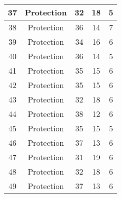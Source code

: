 \documentclass[results.tex]{subfiles}
\begin{document}
\begin{center}
\begin{tabular}{| c || c | c | c | c |}
            \hline
            37                      & Protection                   & 32                     & 18                      & 5                    \\
            \hline
            38                      & Protection                   & 36                     & 14                      & 7                    \\
            \hline
            39                      & Protection                   & 34                     & 16                      & 6                    \\
            \hline
            40                      & Protection                   & 36                     & 14                      & 5                    \\
            \hline
            41                      & Protection                   & 35                     & 15                      & 6                    \\
            \hline
            42                      & Protection                   & 35                     & 15                      & 6                    \\
            \hline
            43                      & Protection                   & 32                     & 18                      & 6                    \\
            \hline
            44                      & Protection                   & 38                     & 12                      & 6                    \\
            \hline
            45                      & Protection                   & 35                     & 15                      & 5                    \\
            \hline
            46                      & Protection                   & 37                     & 13                      & 6                    \\
            \hline
            47                      & Protection                   & 31                     & 19                      & 6                    \\
            \hline
            48                      & Protection                   & 32                     & 18                      & 6                    \\
            \hline
            49                      & Protection                   & 37                     & 13                      & 6                    \\
            \hline
        \end{tabular}
    \end{center}
\end{document}
